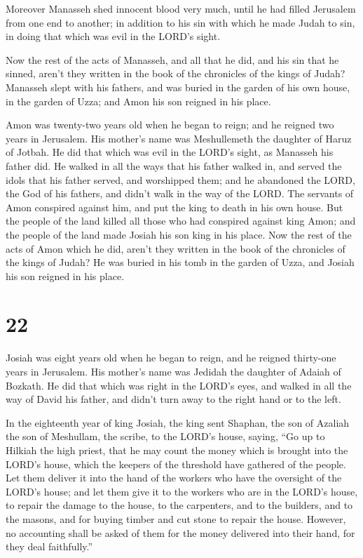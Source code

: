  Moreover Manasseh shed innocent blood very much, until he
had filled Jerusalem from one end to another; in addition to his sin
with which he made Judah to sin, in doing that which was evil in the
LORD's sight.

 Now the rest of the acts of Manasseh, and all that he did,
and his sin that he sinned, aren't they written in the book of the
chronicles of the kings of Judah?  Manasseh slept with his
fathers, and was buried in the garden of his own house, in the garden of
Uzza; and Amon his son reigned in his place.

 Amon was twenty-two years old when he began to reign; and
he reigned two years in Jerusalem. His mother's name was Meshullemeth
the daughter of Haruz of Jotbah.  He did that which was
evil in the LORD's sight, as Manasseh his father did.  He
walked in all the ways that his father walked in, and served the idols
that his father served, and worshipped them;  and he
abandoned the LORD, the God of his fathers, and didn't walk in the way
of the LORD.  The servants of Amon conspired against him,
and put the king to death in his own house.  But the people
of the land killed all those who had conspired against king Amon; and
the people of the land made Josiah his son king in his place.
 Now the rest of the acts of Amon which he did, aren't they
written in the book of the chronicles of the kings of Judah?
 He was buried in his tomb in the garden of Uzza, and
Josiah his son reigned in his place.

\hypertarget{section-21}{%
\section{22}\label{section-21}}

 Josiah was eight years old when he began to reign, and he
reigned thirty-one years in Jerusalem. His mother's name was Jedidah the
daughter of Adaiah of Bozkath.  He did that which was right
in the LORD's eyes, and walked in all the way of David his father, and
didn't turn away to the right hand or to the left.

 In the eighteenth year of king Josiah, the king sent
Shaphan, the son of Azaliah the son of Meshullam, the scribe, to the
LORD's house, saying,  ``Go up to Hilkiah the high priest,
that he may count the money which is brought into the LORD's house,
which the keepers of the threshold have gathered of the people.
 Let them deliver it into the hand of the workers who have
the oversight of the LORD's house; and let them give it to the workers
who are in the LORD's house, to repair the damage to the house,
 to the carpenters, and to the builders, and to the masons,
and for buying timber and cut stone to repair the house. 
However, no accounting shall be asked of them for the money delivered
into their hand, for they deal faithfully.''

